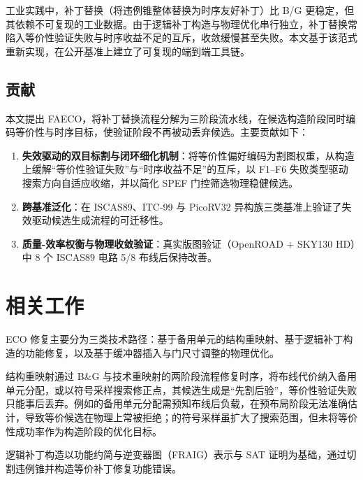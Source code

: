 \documentclass[journal]{IEEEtran}
\begin{document}
工业实践中，补丁替换（将违例锥整体替换为时序友好补丁）比 B/G 更稳定，但其依赖不可复现的工业数据。由于逻辑补丁构造与物理优化串行独立，补丁替换常陷入等价性验证失败与时序收益不足的互斥，收敛缓慢甚至失败。本文基于该范式重新实现，在公开基准上建立了可复现的端到端工具链。

\subsection{贡献}

本文提出 FAECO，将补丁替换流程分解为三阶段流水线，在候选构造阶段同时编码等价性与时序目标，使验证阶段不再被动丢弃候选。主要贡献如下：

\begin{enumerate}
  \item \textbf{失效驱动的双目标割与闭环细化机制}：将等价性偏好编码为割图权重，从构造上缓解“等价性验证失败”与“时序收益不足”的互斥，以 F1--F6 失败类型驱动搜索方向自适应收缩，并以简化 SPEF 门控筛选物理稳健候选。
  \item \textbf{跨基准泛化}：在 ISCAS89、ITC-99 与 PicoRV32 异构族三类基准上验证了失效驱动候选生成流程的可迁移性。
  \item \textbf{质量-效率权衡与物理收敛验证}：真实版图验证（OpenROAD + SKY130 HD）中 8 个 ISCAS89 电路 5/8 布线后保持改善。
\end{enumerate}

\section{相关工作}

ECO 修复主要分为三类技术路径：基于备用单元的结构重映射、基于逻辑补丁构造的功能修复，以及基于缓冲器插入与门尺寸调整的物理优化。

结构重映射通过 B\&G 与技术重映射的两阶段流程修复时序，将布线代价纳入备用单元分配\cite{ho2010eco,ho2012treco}，或以符号采样搜索修正点\cite{kravets2019symbolic}，其候选生成是“先割后验”，等价性验证失败只能事后丢弃。例如\cite{ho2010eco}的备用单元分配需预知布线后负载，在预布局阶段无法准确估计，导致等价候选在物理上常被拒绝；\cite{kravets2019symbolic}的符号采样虽扩大了搜索范围，但未将等价性成功率作为构造阶段的优化目标。

逻辑补丁构造以功能约简与逆变器图（FRAIG）表示与 SAT 证明为基础，通过切割违例锥并构造等价补丁修复功能错误\cite{jiang2010fraig,jiang2016resource}。
\end{document}
